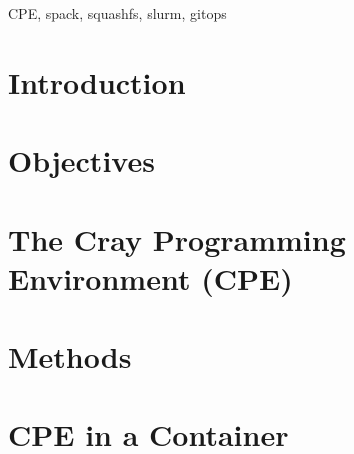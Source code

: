 \documentclass[conference]{IEEEtran}
\begin{document}
\maketitle

\begin{abstract}
    
\end{abstract}

\begin{IEEEkeywords}
CPE, spack, squashfs, slurm, gitops
\end{IEEEkeywords}

\section{Introduction}
\label{sec:introduction}


\section{Objectives}
\label{sec:objectives}


\section{The Cray Programming Environment (CPE)}
\label{sec:cpe}


\section{Methods}
\label{sec:methods}


\section{CPE in a Container}
\label{sec:cpe-container}

\end{document}

